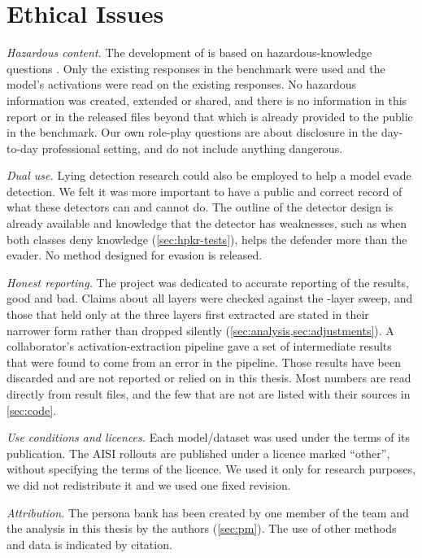 \section{Ethical Issues}
\label{sec:ethics}

\emph{Hazardous content.} The development of \hpkr{} is based on hazardous-knowledge questions
\cite{li2024wmdp}. Only the existing responses in the benchmark were used and the model's activations were
read on the existing responses. No hazardous information was created, extended or shared,
and there is no information in this report or in the released files beyond that which is already
provided to the public in the benchmark. Our own role-play questions are about disclosure in the
day-to-day professional setting, and do not include anything dangerous.

\emph{Dual use.} Lying detection research could also be employed to help a model evade detection.
We felt it was more important to have a public and correct record of what these detectors can
and cannot do. The outline of the detector design is already available \cite{mahadik2026persona} and
knowledge that the detector has weaknesses, such as when both classes deny knowledge
(\cref{sec:hpkr-tests}), helps the defender more than the evader. No method designed for evasion is
released.

\emph{Honest reporting.} The project was dedicated to accurate reporting of the results, good and bad.
Claims about all layers were checked against the -layer sweep, and those that held only at
the three layers first extracted are stated in their narrower form rather than dropped silently
(\cref{sec:analysis,sec:adjustments}). A
collaborator's activation-extraction pipeline gave a set of intermediate results that were found to
come from an error in the pipeline. Those results have been discarded and are not reported or relied
on in this thesis. Most numbers are read directly from result files, and the few that are not are listed
with their sources in \cref{sec:code}.

\emph{Use conditions and licences.} Each model/dataset was used under the terms of its publication. The AISI rollouts \cite{aisi_lie_rollouts} are published under a licence
marked ``other'', without specifying the terms of the licence. We used it only for research
purposes, we did not redistribute it and we used one fixed revision.

\emph{Attribution.} The persona bank has been created by one member of the team and the analysis in
this thesis by the authors (\cref{sec:pm}).
 The use of other methods and data is indicated by
citation.


